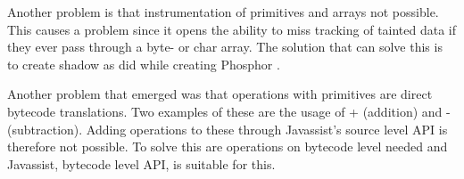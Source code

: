 Another problem is that instrumentation of primitives and arrays not possible. This causes a problem since it opens the ability to miss tracking of tainted data if they ever pass through a byte- or char array. The solution that can solve this is to create shadow as \textcite{BellJ.2014PIdd} did while creating Phosphor \parencite{phosphor}. 

Another problem that emerged was that operations with primitives are direct bytecode translations. Two examples of these are the usage of + (addition) and - (subtraction). Adding operations to these through Javassist's source level API is therefore not possible. To solve this are operations on bytecode level needed and Javassist, bytecode level API, is suitable for this. \parencite{Javassist} 
